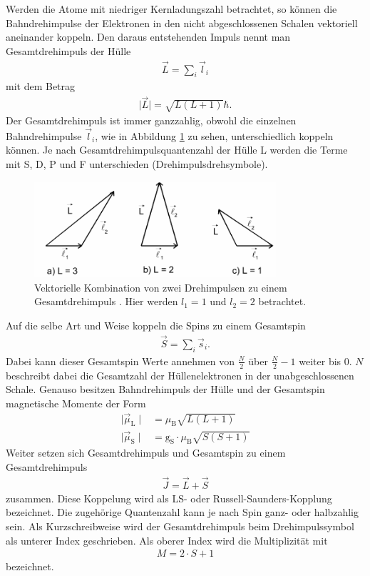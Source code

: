 Werden die Atome mit niedriger Kernladungszahl betrachtet, so können die Bahndrehimpulse
der Elektronen in den nicht abgeschlossenen Schalen vektoriell aneinander koppeln.
Den daraus entstehenden Impuls nennt man Gesamtdrehimpuls der Hülle
\begin{align}
  \vec{L} = \sum_i \vec{l}_i
  \label{eqn:gesamtbahndrehimpuls}
\end{align}
mit dem Betrag
\begin{align}
  \mid\vec{L}\mid = \sqrt{L\left(L+1 \right)} \hbar.
  \label{eqn:betraggesamtdrehipuls}
\end{align}
Der Gesamtdrehimpuls ist immer ganzzahlig, obwohl die einzelnen Bahndrehimpulse $\vec{l}_i$,
wie in Abbildung \ref{abb:drehimpulse} zu sehen, unterschiedlich koppeln können.
Je nach Gesamtdrehimpulsquantenzahl der Hülle L werden die Terme mit S, D, P und F
unterschieden (Drehimpulsdrehsymbole).
\begin{figure}[htb]
  \centering
  \includegraphics[width=0.8\textwidth]{images/V27.pdf}
  \caption{Vektorielle Kombination von zwei Drehimpulsen zu einem Gesamtdrehimpuls
  \cite{anleitung}. Hier werden $l_1 = 1$ und $l_2 = 2$ betrachtet.}
  \label{abb:drehimpulse}
\end{figure}
Auf die selbe Art und Weise koppeln die Spins zu einem Gesamtspin
\begin{align}
  \vec{S} = \sum_i \vec{s}_i.
  \label{eqn:gesamtspin}
\end{align}
Dabei kann dieser Gesamtspin Werte annehmen von $\frac{N}{2}$ über $\frac{N}{2}-1$
weiter bis $\num{0}$. $N$ beschreibt dabei die Gesamtzahl der Hüllenelektronen in
der unabgeschlossenen Schale.
Genauso besitzen Bahndrehimpuls der Hülle und der Gesamtspin magnetische Momente
der Form
\begin{align}
  \mid \vec{\mu}_\text{L} \mid &= \mu_\text{B} \sqrt{L\left(L+1 \right)} \\
  \mid \vec{\mu}_\text{S} \mid &= \text{g}_\text{S}\cdot \mu_\text{B} \sqrt{S\left(S+1 \right)}
  \label{eqn:gesamtmomente}
\end{align}
Weiter setzen sich Gesamtdrehimpuls und Gesamtspin zu einem Gesamtdrehimpuls
\begin{align}
  \vec{J} = \vec{L} + \vec{S}
  \label{eqn:gesamtdrehimpuls}
\end{align}
zusammen. Diese Koppelung wird als LS- oder Russell-Saunders-Kopplung bezeichnet.
Die zugehörige Quantenzahl kann je nach Spin ganz- oder halbzahlig sein. Als
Kurzschreibweise wird der Gesamtdrehimpuls beim Drehimpulssymbol als unterer Index
geschrieben. Als oberer Index wird die Multiplizität mit
\begin{align}
  M = 2\cdot S + 1
\end{align}
bezeichnet.

